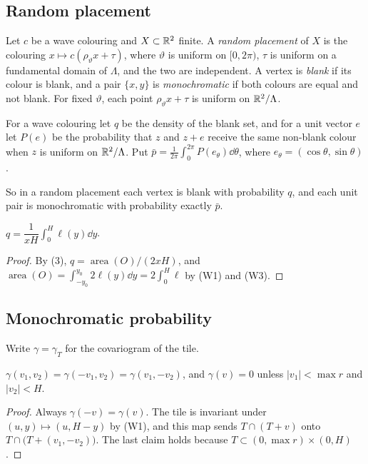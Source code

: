 \documentclass[11pt,colorlinks]{charlie}
\newcommand{\area}{\operatorname{area}}
\begin{document}
\subsection{Random placement}
Let $c$ be a wave colouring and $X\subset\mathbb{R}^2$ finite. A \emph{random placement} of $X$ is the colouring $x\mapsto c(\rho_\vartheta x+\tau)$, where $\vartheta$ is uniform on $[0,2\pi)$, $\tau$ is uniform on a fundamental domain of $\Lambda$, and the two are independent. A vertex is \emph{blank} if its colour is blank, and a pair $\{x,y\}$ is \emph{monochromatic} if both colours are equal and not blank. For fixed $\vartheta$, each point $\rho_\vartheta x+\tau$ is uniform on $\mathbb{R}^2/\Lambda$.

\begin{definition}\label{def:qp}
For a wave colouring let $q$ be the density of the blank set, and for a unit vector $e$ let $P(e)$ be the probability that $z$ and $z+e$ receive the same non-blank colour when $z$ is uniform on $\mathbb{R}^2/\Lambda$. Put $\bar p=\frac1{2\pi}\int_0^{2\pi}P(e_\theta)\dd\theta$, where $e_\theta=(\cos\theta,\sin\theta)$.
\end{definition}

So in a random placement each vertex is blank with probability $q$, and each unit pair is monochromatic with probability exactly $\bar p$.

\begin{lemma}\label{lem:q}
$q=\dfrac{1}{xH}\displaystyle\int_0^H\ell(y)\dd y$.
\end{lemma}
\begin{proof}
By (3), $q=\area(O)/(2xH)$, and $\area(O)=\int_{-y_0}^{y_0}2\ell(y)\dd y=2\int_0^H\ell$ by (W1) and (W3).
\end{proof}

\subsection{Monochromatic probability}
Write $\gamma=\gamma_T$ for the covariogram of the tile.

\begin{lemma}\label{lem:gamma-even}
$\gamma(v_1,v_2)=\gamma(-v_1,v_2)=\gamma(v_1,-v_2)$, and $\gamma(v)=0$ unless $|v_1|<\max r$ and $|v_2|<H$.
\end{lemma}
\begin{proof}
Always $\gamma(-v)=\gamma(v)$. The tile is invariant under $(u,y)\mapsto(u,H-y)$ by (W1), and this map sends $T\cap(T+v)$ onto $T\cap\big(T+(v_1,-v_2)\big)$. The last claim holds because $T\subset(0,\max r)\times(0,H)$.
\end{proof}
\end{document}
